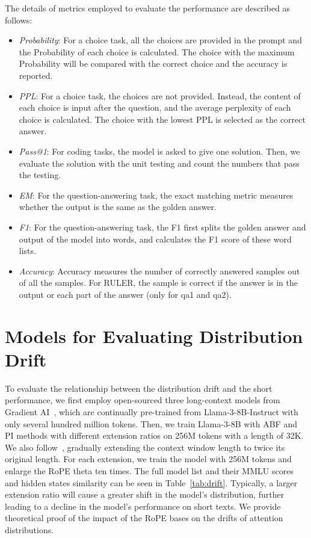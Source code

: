 The details of metrics employed to evaluate the performance are described as follows:
\begin{itemize}
    \item \emph{Probability}: For a choice task, all the choices are provided in the prompt and the Probability of each choice is calculated. The choice with the maximum Probability will be compared with the correct choice and the accuracy is reported.
    \item \emph{PPL}: For a choice task, the choices are not provided. Instead, the content of each choice is input after the question, and the average perplexity of each choice is calculated. The choice with the lowest PPL is selected as the correct answer.
    \item \emph{Pass@1}:  For coding tasks, the model is asked to give one solution. Then, we evaluate the solution with the unit testing and count the numbers that pass the testing. 
    \item \emph{EM}:  For the question-answering task, the exact matching metric measures whether the output is the same as the golden answer.
    \item \emph{F1}:  For the question-answering task, the F1 first splits the golden answer and output of the model into words, and calculates the F1 score of these word lists. 
    \item \emph{Accuracy}:   Accuracy measures the number of correctly answered samples out of all the samples. For RULER, the sample is correct if the answer is in the output or each part of the answer (only for qa1 and qa2).  

\end{itemize}


\section{Models for Evaluating Distribution Drift}
\label{app:drift_models}
To evaluate the relationship between the distribution drift and the short performance, we first employ open-sourced three long-context models from Gradient AI~\cite{gradient-hf-2024-longcontextllama3}, which are continually pre-trained from Llama-3-8B-Instruct with only several hundred million tokens. Then, we train Llama-3-8B with ABF and PI methods with different extension ratios on 256M tokens with a length of 32K. We also follow~\citet{gradient-hf-2024-longcontextllama3}, gradually extending the context window length to twice its original length. For each extension, we train the model with 256M tokens and 
enlarge the RoPE theta ten times. The full model list and their MMLU scores and hidden states similarity can be seen in Table~\ref{tab:drift}. Typically, a larger extension ratio will cause a greater shift in the model's distribution, further leading to a decline in the model's performance on short texts. We provide theoretical proof of the impact of the RoPE bases on the drifts of attention distributions.


